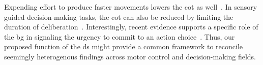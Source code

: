 \par
Expending effort to produce faster movements lowers the \gls{cot} as well~\cite{Shadmehr2019TINS}.
In sensory guided decision-making tasks, the \gls{cot} can also be reduced by limiting the duration of deliberation~\cite{Carland2019NeuroSci}.
Interestingly, recent evidence supports a specific role of the \gls{bg} in signaling the urgency to commit to an action choice~\cite{Thura2017Neruon,Carland2019NeuroSci}.
Thus, our proposed function of the \gls{ds} might provide a common framework to reconcile seemingly heterogenous findings across motor control and decision-making fields.

